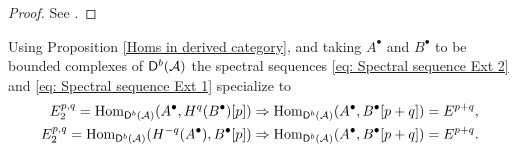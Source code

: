 \begin{proof}
    See \cite[\S 2, Example 2.70]{huybrechts2006fouriermukai}.
\end{proof}

\begin{remark}
    Using Proposition \ref{Homs in derived category}, and taking $A^\bullet$ and $B^\bullet$ to be bounded complexes of $\mathsf{D}^b(\mathcal A)$ the spectral sequences \eqref{eq: Spectral sequence Ext 2} and \eqref{eq: Spectral sequence Ext 1} specialize to 
    \begin{align}
        E^{p,q}_2 = \mathrm{Hom}_{\mathsf{D}^b(\mathcal A)}(A^\bullet, H^q(B^\bullet)[p]) &\Rightarrow \mathrm{Hom}_{\mathsf{D}^b(\mathcal A)}(A^\bullet, B^\bullet[p+q]) = E^{p+q}, \\
        E^{p,q}_2 = \mathrm{Hom}_{\mathsf{D}^b(\mathcal A)}(H^{-q}(A^\bullet), B^\bullet[p]) &\Rightarrow \mathrm{Hom}_{\mathsf{D}^b(\mathcal A)}(A^\bullet, B^\bullet[p+q]) = E^{p+q}. 
        \label{eq: Spectral sequence derived hom 1}
    \end{align}
\end{remark}
